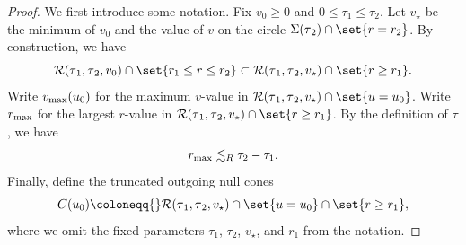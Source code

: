 \documentclass[10pt, reqno]{amsart}
\begin{document}
\begin{proof}
We first introduce some notation. Fix \(v_0\ge 0\) and \(0\le \tau_1\le \tau_2\). Let
\(v_\star{}\) be the minimum of \(v_0\) and the value of \(v\) on the circle
\(\Sigma(\tau{}_2)\cap \set{r=r_2}\). By construction, we have
\begin{equation}\label{t-set-containment}
\mathcal{R}(\tau{}_1,\tau{}_2,v_0)\cap \set{r_1\le r\le r_2}\subset \mathcal{R}(\tau{}_1,\tau{}_2,v_\star{})\cap \set{r\ge r_1}.
\end{equation}
Write \(v_{\textnormal{max}}(u_0)\) for the maximum \(v\)-value in
\(\mathcal{R}(\tau{}_1,\tau{}_2,v_\star{})\cap \set{u=u_0}\). Write
\(r_{\textnormal{max}}\) for the largest \(r\)-value in \(\mathcal{R}(\tau{}_1,\tau{}_2,v_\star{})\cap \set{r\ge r_1}\). By the definition of \(\tau{}\), we have
\begin{equation}\label{r-max-estimate}
r_{\textnormal{max}}\lesssim_{R}\tau_2-\tau_1.
\end{equation}
Finally, define the truncated outgoing null cones
\begin{equation}
C(u_0)\coloneqq{}\mathcal{R}(\tau{}_1,\tau{}_2,v_\star{})\cap \set{u=u_0}\cap \set{r\ge r_1},
\end{equation}
where we omit the fixed parameters \(\tau_1\), \(\tau_2\), \(v_\star\), and \(r_1\) from the notation.


\end{proof}
\end{document}
